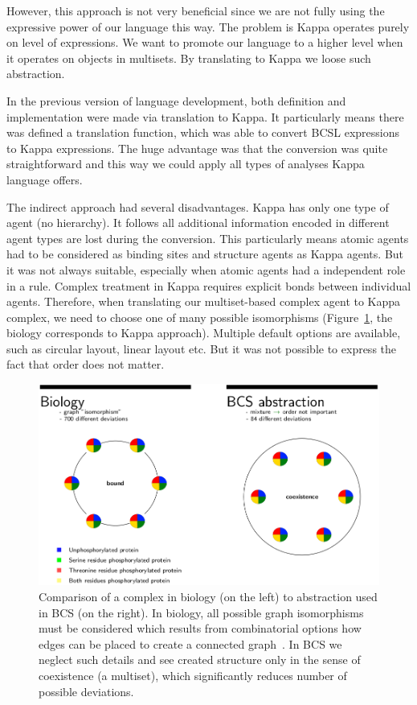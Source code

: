 \documentclass[12pt]{fithesis2}
\begin{document}
However, this approach is not very beneficial since we are not fully using the expressive power of our language this way. The problem is Kappa operates purely on level of expressions. We want to promote our language to a higher level when it operates on objects in multisets. By translating to Kappa we loose such abstraction. 

In the previous version of language development, both definition and implementation were made via translation to Kappa. It particularly means there was defined a translation function, which was able to convert BCSL expressions to Kappa expressions. The huge advantage was that the conversion was quite straightforward and this way we could apply all types of analyses Kappa language offers.

The indirect approach had several disadvantages. Kappa has only one type of agent (no hierarchy). It follows all additional information encoded in different agent types are lost during the conversion. This particularly means atomic agents had to be considered as binding sites and structure agents as Kappa agents. But it was not always suitable, especially when atomic agents had a independent role in a rule. Complex treatment in Kappa requires explicit bonds between individual agents. Therefore, when translating our multiset-based complex agent to Kappa complex, we need to choose one of many possible isomorphisms (Figure~\ref{abstraction_comparision}, the biology corresponds to Kappa approach). Multiple default options are available, such as circular layout, linear layout etc. But it was not possible to express the fact that order does not matter.

\begin{figure}[!h]
\begin{center}
  \includegraphics[scale=0.35]{pics/abstraction}
\end{center}
\caption{Comparison of a complex in biology (on the left) to abstraction used in BCS (on the right). In biology, all possible graph isomorphisms must be considered which results from combinatorial options how edges can be placed to create a connected graph~\cite{Chartrand1985}. In BCS we neglect such details and see created structure only in the sense of coexistence (a multiset), which significantly reduces number of possible deviations.}\label{abstraction_comparision}
\end{figure}
\end{document}
